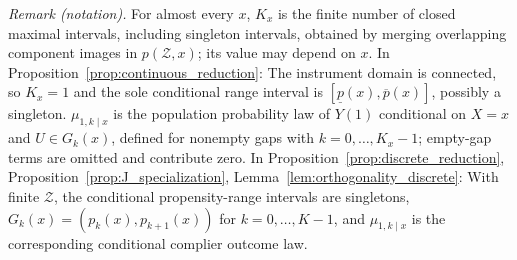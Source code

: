 \noindent\textit{Remark (notation).} For almost every $x$, $K_x$ is the finite number of closed maximal intervals, including singleton intervals, obtained by merging overlapping component images in $p(\mathcal Z,x)$; its value may depend on $x$. In Proposition~\ref{prop:continuous_reduction}: The instrument domain is connected, so $K_x=1$ and the sole conditional range interval is $[\underline p(x),\overline p(x)]$, possibly a singleton. $\mu_{1,k\mid x}$ is the population probability law of $Y(1)$ conditional on $X=x$ and $U\in G_k(x)$, defined for nonempty gaps with $k=0,\ldots,K_x-1$; empty-gap terms are omitted and contribute zero. In Proposition~\ref{prop:discrete_reduction}, Proposition~\ref{prop:J_specialization}, Lemma~\ref{lem:orthogonality_discrete}: With finite $\mathcal Z$, the conditional propensity-range intervals are singletons, $G_k(x)=(p_k(x),p_{k+1}(x))$ for $k=0,\ldots,K-1$, and $\mu_{1,k\mid x}$ is the corresponding conditional complier outcome law.


